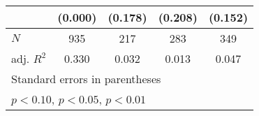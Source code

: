 {\begin{tabular}{l*{4}{c}}
            &     (0.000)         &     (0.178)         &     (0.208)         &     (0.152)         \\
\hline
\(N\)       &         935         &         217         &         283         &         349         \\
adj. \(R^{2}\)&       0.330         &       0.032         &       0.013         &       0.047         \\
\hline\hline
\multicolumn{5}{l}{\footnotesize Standard errors in parentheses}\\
\multicolumn{5}{l}{\footnotesize \sym{*} \(p<0.10\), \sym{**} \(p<0.05\), \sym{***} \(p<0.01\)}\\
\end{tabular}
}
